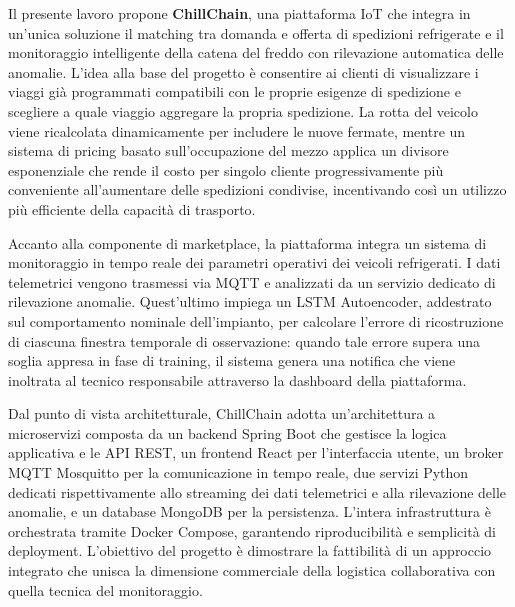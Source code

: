 Il presente lavoro propone \textbf{ChillChain}, una piattaforma IoT che integra in un'unica soluzione il matching tra domanda e offerta di spedizioni refrigerate e il monitoraggio intelligente della catena del freddo con rilevazione automatica delle anomalie. L'idea alla base del progetto è consentire ai clienti di visualizzare i viaggi già programmati compatibili con le proprie esigenze di spedizione e scegliere a quale viaggio aggregare la propria spedizione. La rotta del veicolo viene ricalcolata dinamicamente per includere le nuove fermate, mentre un sistema di pricing basato sull'occupazione del mezzo applica un divisore esponenziale che rende il costo per singolo cliente progressivamente più conveniente all'aumentare delle spedizioni condivise, incentivando così un utilizzo più efficiente della capacità di trasporto.

Accanto alla componente di marketplace, la piattaforma integra un sistema di monitoraggio in tempo reale dei parametri operativi dei veicoli refrigerati. I dati telemetrici vengono trasmessi via MQTT e analizzati da un servizio dedicato di rilevazione anomalie. Quest'ultimo impiega un LSTM Autoencoder, addestrato sul comportamento nominale dell'impianto, per calcolare l'errore di ricostruzione di ciascuna finestra temporale di osservazione: quando tale errore supera una soglia appresa in fase di training, il sistema genera una notifica che viene inoltrata al tecnico responsabile attraverso la dashboard della piattaforma.

Dal punto di vista architetturale, ChillChain adotta un'architettura a microservizi composta da un backend Spring Boot che gestisce la logica applicativa e le API REST, un frontend React per l'interfaccia utente, un broker MQTT Mosquitto per la comunicazione in tempo reale, due servizi Python dedicati rispettivamente allo streaming dei dati telemetrici e alla rilevazione delle anomalie, e un database MongoDB per la persistenza. L'intera infrastruttura è orchestrata tramite Docker Compose, garantendo riproducibilità e semplicità di deployment. L'obiettivo del progetto è dimostrare la fattibilità di un approccio integrato che unisca la dimensione commerciale della logistica collaborativa con quella tecnica del monitoraggio.